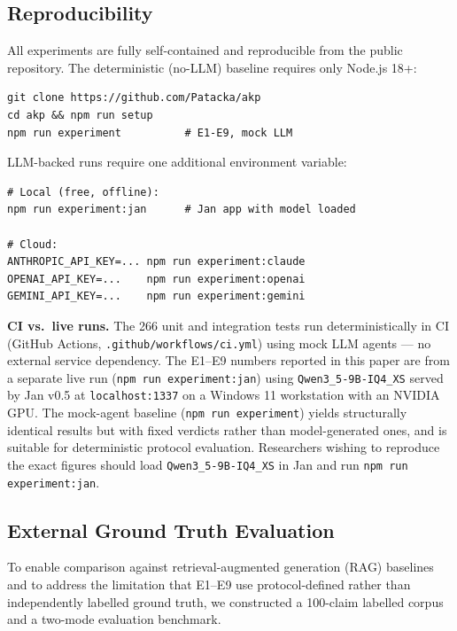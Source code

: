 \documentclass[10pt,twocolumn]{article}
\begin{document}
\subsection{Reproducibility}

All experiments are fully self-contained and reproducible from the public
repository. The deterministic (no-LLM) baseline requires only Node.js 18+:

\begin{lstlisting}
git clone https://github.com/Patacka/akp
cd akp && npm run setup
npm run experiment          # E1-E9, mock LLM
\end{lstlisting}

LLM-backed runs require one additional environment variable:
\begin{lstlisting}
# Local (free, offline):
npm run experiment:jan      # Jan app with model loaded

# Cloud:
ANTHROPIC_API_KEY=... npm run experiment:claude
OPENAI_API_KEY=...    npm run experiment:openai
GEMINI_API_KEY=...    npm run experiment:gemini
\end{lstlisting}

\textbf{CI vs.\ live runs.} The 266 unit and integration tests run
deterministically in CI (GitHub Actions, \texttt{.github/workflows/ci.yml})
using mock LLM agents — no external service dependency.
The E1--E9 numbers reported in this paper are from a separate live run
(\texttt{npm run experiment:jan}) using \texttt{Qwen3\_5-9B-IQ4\_XS}
served by Jan v0.5 at \texttt{localhost:1337} on a Windows 11 workstation
with an NVIDIA GPU. The mock-agent baseline (\texttt{npm run experiment})
yields structurally identical results but with fixed verdicts rather than
model-generated ones, and is suitable for deterministic protocol evaluation.
Researchers wishing to reproduce the exact figures should load
\texttt{Qwen3\_5-9B-IQ4\_XS} in Jan and run \texttt{npm run experiment:jan}.

\subsection{External Ground Truth Evaluation}
\label{sec:groundtruth}

To enable comparison against retrieval-augmented generation (RAG)
baselines and to address the limitation that E1--E9 use protocol-defined
rather than independently labelled ground truth, we constructed a
100-claim labelled corpus and a two-mode evaluation benchmark.
\end{document}

